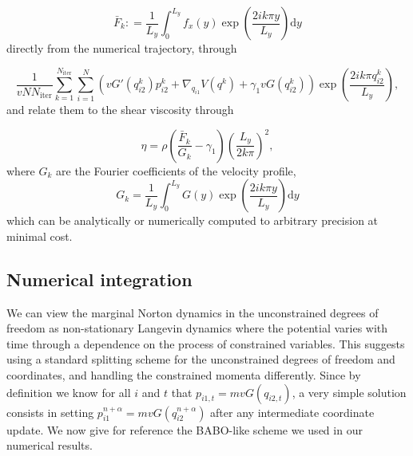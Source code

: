 \documentclass[a4paper,10pt,twoside,leqno]{report}
\newcommand{\dif}{\mathrm{d}}
\newcommand{\defeq}{\mathrel{\mathop:}=}
\newcommand{\1}{\mathbbm{1}}
\begin{document}
    \begin{equation}
        \label{eq:norton_fourier_coefficients}
        \bar F_k\defeq\frac{1}{L_y}\int_0^{L_y}f_x(y)\exp\left(\frac{2ik\pi y}{L_y}\right)\dif y
    \end{equation}
    directly from the numerical trajectory, through
    
    \begin{equation}
        \label{eq:norton_fourier_estimator}
        \frac{1}{vN N_{\mathrm{iter}}}\sum_{k=1}^{N_{\mathrm{iter}}}\sum_{i=1}^N\left(vG'\left(q_{i2}^k\right)p_{i2}^k+\nabla_{q_{i1}}V(q^k)+\gamma_1vG\left(q_{i2}^k\right)\right)\exp\left(\frac{2ik\pi q_{i2}^k}{L_y}\right),
    \end{equation}
    and relate them to the shear viscosity through
    
    \begin{equation}
        \label{eq:norton_shear_viscosity_estimator}
        \eta=\rho\left(\frac{\bar F_k}{G_k} -\gamma_1\right)\left(\frac{L_y}{2k\pi}\right)^2,
    \end{equation}
    where $G_k$ are the Fourier coefficients of the velocity profile,
    \[G_k=\frac{1}{L_y}\int_0^{L_y} G(y)\exp\left(\frac{2ik\pi y}{L_y}\right)\dif y\]
    which can be analytically or numerically computed to arbitrary precision at minimal cost.
    
    \subsection{Numerical integration}
    We can view the marginal Norton dynamics in the unconstrained degrees of freedom as non-stationary Langevin dynamics where the potential varies with time through a dependence on the process of constrained variables.
    This suggests using a standard splitting scheme for the unconstrained degrees of freedom and coordinates, and handling the constrained momenta differently. Since by definition we know for all $i$ and $t$ that $p_{i1,t}=mvG(q_{i2,t})$, a very simple solution consists in setting
    $p^{n+\alpha}_{i1}=mv G(q^{n+\alpha}_{i2})$ after any intermediate coordinate update. We now give for reference the BABO-like scheme we used in our numerical results.
    
\end{document}
